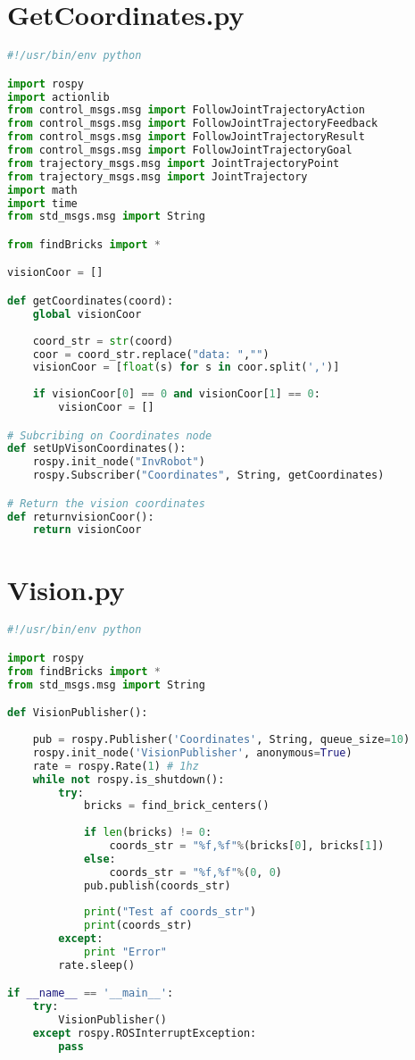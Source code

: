 \section{GetCoordinates.py}\label{sec:GetCoordinates}
\begin{lstlisting}[language=Python]
#!/usr/bin/env python

import rospy
import actionlib
from control_msgs.msg import FollowJointTrajectoryAction
from control_msgs.msg import FollowJointTrajectoryFeedback
from control_msgs.msg import FollowJointTrajectoryResult
from control_msgs.msg import FollowJointTrajectoryGoal
from trajectory_msgs.msg import JointTrajectoryPoint
from trajectory_msgs.msg import JointTrajectory
import math
import time
from std_msgs.msg import String

from findBricks import *

visionCoor = []

def getCoordinates(coord):    
    global visionCoor
    
    coord_str = str(coord)
    coor = coord_str.replace("data: ","")
    visionCoor = [float(s) for s in coor.split(',')]
    
    if visionCoor[0] == 0 and visionCoor[1] == 0:
        visionCoor = []

# Subcribing on Coordinates node
def setUpVisonCoordinates():
    rospy.init_node("InvRobot")
    rospy.Subscriber("Coordinates", String, getCoordinates)

# Return the vision coordinates
def returnvisionCoor():
    return visionCoor	
\end{lstlisting}


\newpage
\section{Vision.py}\label{sec:VisionNode}
\begin{lstlisting}[language=Python]
#!/usr/bin/env python

import rospy
from findBricks import *
from std_msgs.msg import String

def VisionPublisher():
    
    pub = rospy.Publisher('Coordinates', String, queue_size=10)
    rospy.init_node('VisionPublisher', anonymous=True)
    rate = rospy.Rate(1) # 1hz
    while not rospy.is_shutdown():
        try:
            bricks = find_brick_centers()
            
            if len(bricks) != 0:        
                coords_str = "%f,%f"%(bricks[0], bricks[1])
            else:
                coords_str = "%f,%f"%(0, 0)          
            pub.publish(coords_str)
            
            print("Test af coords_str")
            print(coords_str)
        except:
            print "Error"
        rate.sleep()

if __name__ == '__main__':
    try:
        VisionPublisher()
    except rospy.ROSInterruptException:
        pass
\end{lstlisting}


